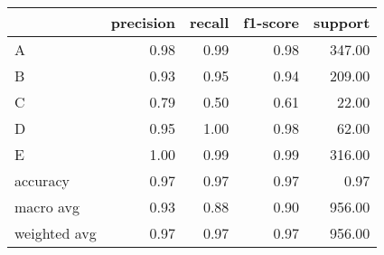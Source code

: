 \begin{tabular}{|l|r|r|r|r|}
\hline
{} &  precision &  recall &  f1-score &  support \\
\hline
A            &       0.98 &    0.99 &      0.98 &   347.00 \\
B            &       0.93 &    0.95 &      0.94 &   209.00 \\
C            &       0.79 &    0.50 &      0.61 &    22.00 \\
D            &       0.95 &    1.00 &      0.98 &    62.00 \\
E            &       1.00 &    0.99 &      0.99 &   316.00 \\
accuracy     &       0.97 &    0.97 &      0.97 &     0.97 \\
macro avg    &       0.93 &    0.88 &      0.90 &   956.00 \\
weighted avg &       0.97 &    0.97 &      0.97 &   956.00 \\
\hline
\end{tabular}
